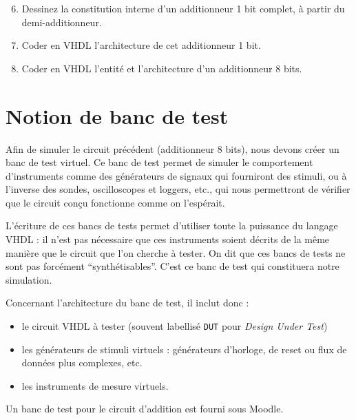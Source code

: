 \documentclass[a4paper,11pt]{article}
\begin{document}
\begin{questionbox}
\begin{enumerate}
    \setcounter{enumi}{5}
    \item Dessinez la constitution interne d'un additionneur 1 bit complet, à partir du demi-additionneur.
    \item Coder en VHDL l'architecture de cet additionneur 1 bit.
    \item Coder en VHDL l'entité et l'architecture d'un additionneur 8 bits.
\end{enumerate}
\end{questionbox}

\section{Notion de banc de test}

Afin de simuler le circuit précédent (additionneur 8 bits), nous devons créer un banc de test virtuel. Ce banc de test permet de simuler le comportement d'instruments comme des générateurs de signaux qui fourniront des stimuli, ou à l'inverse des sondes, oscilloscopes et loggers, etc., qui nous permettront de vérifier que le circuit conçu fonctionne comme on l'espérait.

L'écriture de ces bancs de tests permet d'utiliser toute la puissance du langage VHDL : il n'est pas nécessaire que ces instruments soient décrits de la même manière que le circuit que l'on cherche à tester. On dit que ces bancs de tests ne sont pas forcément ``synthétisables''. C'est ce banc de test qui constituera notre simulation.

Concernant l'architecture du banc de test, il inclut donc :
\begin{itemize}
    \item le circuit VHDL à tester (souvent labellisé \texttt{DUT} pour \textit{Design Under Test})
    \item les générateurs de stimuli virtuels : générateurs d'horloge, de reset ou flux de données plus complexes, etc.
    \item les instruments de mesure virtuels.
\end{itemize}

Un banc de test pour le circuit d'addition est fourni sous Moodle.
\end{document}
